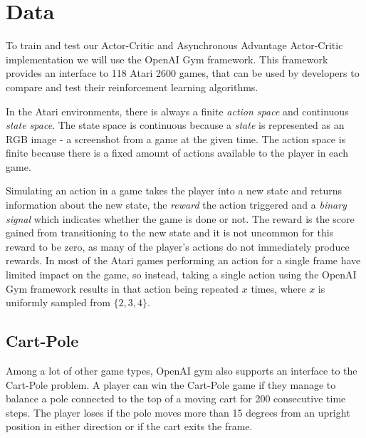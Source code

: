 \documentclass[11pt]{article}
\begin{document}
\maketitle

\section{Data}\label{Data}

To train and test our Actor-Critic and Asynchronous Advantage Actor-Critic implementation we will use
the OpenAI Gym framework\cite{openAIGym}.
This framework provides an interface to 118 Atari 2600 games,
that can be used by developers to compare and test their reinforcement learning algorithms.
 
In the Atari environments, there is always a finite \textit{action space} and continuous \textit{state space}.
The state space is continuous because a \textit{state} is represented as an RGB image - a screenshot from a game
at the given time. The action space is finite because there is a fixed amount of
actions available to the player in each game.

Simulating an action in a game takes the player into a new state
and returns information about the new state,
the \textit{reward} the action triggered and a \textit{binary signal} which indicates whether the 
game is done or not.
The reward is the score gained from transitioning to the new state and
it is not uncommon for this reward to be zero, as many of the player's actions do not immediately produce rewards.
In most of the Atari games performing an action for a single frame have limited impact on the game,
so instead, taking a single action using the OpenAI Gym framework
results in that action being repeated $x$ times, where $x$ is uniformly sampled from $\{2, 3, 4\}$.

\subsection{Cart-Pole}

Among a lot of other game types, OpenAI gym also supports an interface
to the Cart-Pole problem.
A player can win the Cart-Pole game if they manage to balance a pole connected to the top of a moving cart for
200 consecutive time steps.
The player loses if the pole moves more than 15 degrees from an upright position in
either direction or if the cart exits the frame.
\end{document}

